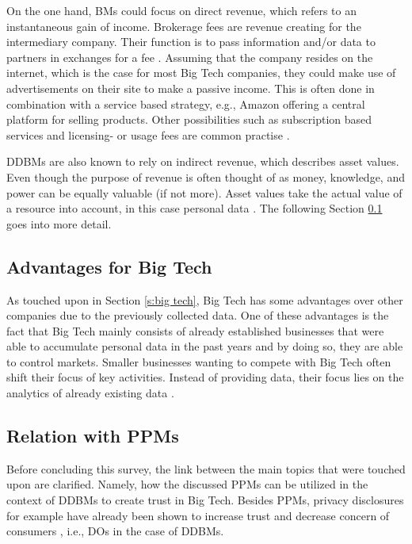 On the one hand, \gls{BM}s could focus on direct revenue, which refers to an instantaneous gain of income.
Brokerage fees are revenue creating for the intermediary company. Their function is to pass information and/or data to partners in exchanges for a fee \cite{Hartmann2016}.
Assuming that the company resides on the internet, which is the case for most Big Tech companies, they could make use of advertisements on their site to make a passive income.
This is often done in combination with a service based strategy, e.g., Amazon offering a central platform for selling products.
Other possibilities such as subscription based services and licensing- or usage fees are common practise \cite{Hartmann2016}. 

\gls{DDBM}s are also known to rely on indirect revenue, which describes asset values. 
Even though the purpose of revenue is often thought of as money, knowledge, and power can be equally valuable (if not more). 
Asset values take the actual value of a resource into account, in this case personal data \cite{Hartmann2016}. 
The following Section \ref{s:advantages big tech} goes into more detail.

\subsection{Advantages for Big Tech}
\label{s:advantages big tech}
As touched upon in Section \ref{s:big tech}, Big Tech has some advantages over other companies due to the previously collected data.
One of these advantages is the fact that Big Tech mainly consists of already established businesses that were able to accumulate personal data in the past years and by doing so, they are able to control markets.
Smaller businesses wanting to compete with Big Tech often shift their focus of key activities.
Instead of providing data, their focus lies on the analytics of already existing data \cite{Hartmann2016}. 

\subsection{Relation with \gls{PPM}s}
\label{s:relation PPM}
Before concluding this survey, the link between the main topics that were touched upon are clarified.
Namely, how the discussed \gls{PPM}s can be utilized in the context of \gls{DDBM}s to create trust in Big Tech.
Besides \gls{PPM}s, privacy disclosures for example have already been shown to increase trust and decrease concern of consumers \cite{Pan2006}, i.e., \gls{DO}s in the case of \gls{DDBM}s.


